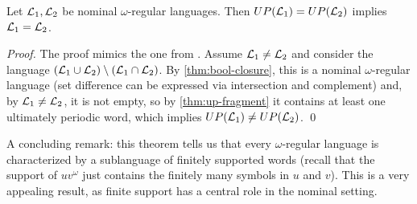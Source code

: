 \begin{theorem}
\label{thm:up-determinacy}
Let $\mathcal{L}_1,\mathcal{L}_2$ be nominal $\omega$-regular languages. Then $UP(\mathcal{L}_1) = UP(\mathcal{L}_2)$ implies $\mathcal{L}_1 = \mathcal{L}_2$.
\end{theorem}
\begin{proof}
The proof mimics the one from \cite{CalbrixNP93}. Assume $\mathcal{L}_1 \neq \mathcal{L}_2$ and consider the language $(\mathcal{L}_1 \cup \mathcal{L}_2) \setminus (\mathcal{L}_1 \cap \mathcal{L}_2)$. By \cref{thm:bool-closure}, this is a nominal $\omega$-regular language (set difference can be expressed via intersection and complement)  and, by $\mathcal{L}_1 \neq \mathcal{L}_2$, it is not empty, so by \cref{thm:up-fragment} it contains at least one ultimately periodic word, which implies $UP(\mathcal{L}_1) \neq UP(\mathcal{L}_2)$. \qed
\end{proof}
% 
A concluding remark: this theorem tells us that every $\omega$-regular language is characterized by a sublanguage of finitely supported words (recall that the support of $uv^\omega$ just contains the finitely many symbols in $u$ and $v$). This is a very appealing result, as finite support has a central role in the nominal setting. 

